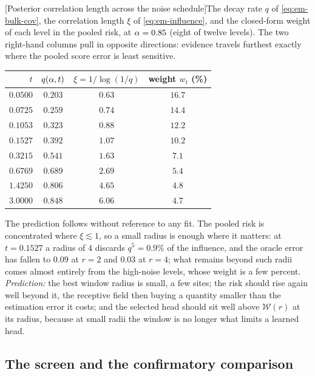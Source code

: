 \begin{center}
\begin{minipage}{\linewidth}\small\centering
{}[Posterior correlation length across the noise schedule]{The
decay rate $q$ of \eqref{eq:em-bulk-cov}, the correlation length $\xi$ of
\eqref{eq:em-influence}, and the closed-form weight of each level in the
pooled risk, at $\alpha = 0.85$ (eight of twelve levels). The two right-hand
columns pull in opposite directions: evidence travels furthest exactly where
the pooled score error is least sensitive.}
\label{tab:em-locality}
\begin{tabular}{@{}rccc@{}}
\toprule
$t$ & $q(\alpha,t)$ & $\xi = 1/\log(1/q)$ & weight $w_t$ (\%) \\
\midrule
$0.0500$ & $0.203$ & $0.63$ & $16.7$ \\
$0.0725$ & $0.259$ & $0.74$ & $14.4$ \\
$0.1053$ & $0.323$ & $0.88$ & $12.2$ \\
$0.1527$ & $0.392$ & $1.07$ & $10.2$ \\
$0.3215$ & $0.541$ & $1.63$ & $7.1$ \\
$0.6769$ & $0.689$ & $2.69$ & $5.4$ \\
$1.4250$ & $0.806$ & $4.65$ & $4.8$ \\
$3.0000$ & $0.848$ & $6.06$ & $4.7$ \\
\bottomrule
\end{tabular}
\end{minipage}
\end{center}

\noindent The prediction follows without reference to any fit. The pooled
risk is concentrated where $\xi \lesssim 1$, so a small radius is enough where
it matters: at $t = 0.1527$ a radius of $4$ discards $q^5 = 0.9\%$ of the
influence, and the oracle error has fallen to $0.09$ at $r = 2$ and $0.03$
at $r = 4$; what remains beyond such radii comes almost entirely from the
high-noise levels, whose weight is a few percent. \emph{Prediction:} the best
window radius is small, a few sites; the risk should rise again well beyond
it, the receptive field then buying a quantity smaller than the estimation
error it costs; and the selected head should sit well above $\mathcal W(r)$
at its radius, because at small radii the window is no longer what limits a
learned head.

\subsection{The screen and the confirmatory comparison}\label{sec:em-screen}

